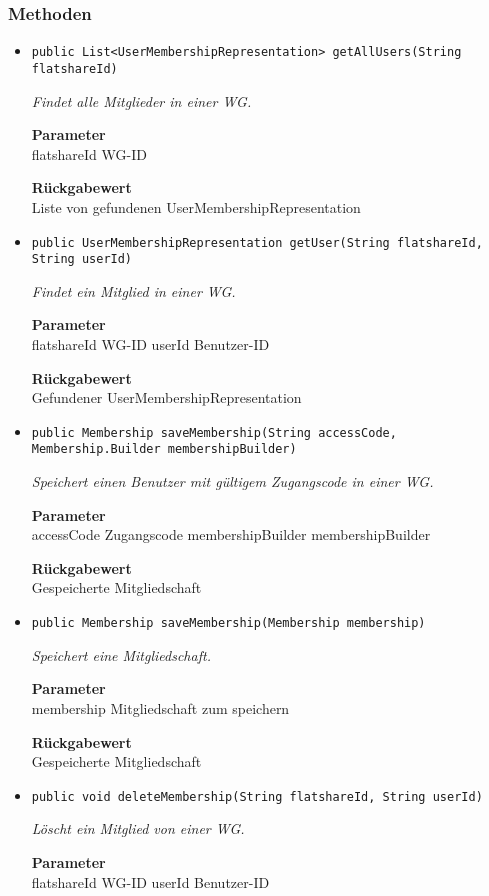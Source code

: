     \subsubsection{Methoden}
    \begin{itemize}
    	\item{\texttt{public List<UserMembershipRepresentation> getAllUsers(String flatshareId)}}
    	
    	\textit{Findet alle Mitglieder in einer WG.}
    	
    	\textbf{Parameter} \\
    	flatshareId WG-ID
    	
    	\textbf{Rückgabewert} \\
    	Liste von gefundenen UserMembershipRepresentation        \item{\texttt{public UserMembershipRepresentation getUser(String flatshareId, String userId)}}
    	
    	\textit{Findet ein Mitglied in einer WG.}
    	
    	\textbf{Parameter} \\
    	flatshareId WG-ID
    	userId Benutzer-ID
    	
    	\textbf{Rückgabewert} \\
    	Gefundener UserMembershipRepresentation        \item{\texttt{public Membership saveMembership(String accessCode, Membership.Builder membershipBuilder)}}
    	
    	\textit{Speichert einen Benutzer mit gültigem Zugangscode in einer WG.}
    	
    	\textbf{Parameter} \\
    	accessCode Zugangscode
    	membershipBuilder membershipBuilder
    	
    	\textbf{Rückgabewert} \\
    	Gespeicherte Mitgliedschaft        \item{\texttt{public Membership saveMembership(Membership membership)}}
    	
    	\textit{Speichert eine Mitgliedschaft.}
    	
    	\textbf{Parameter} \\
    	membership Mitgliedschaft zum speichern
    	
    	\textbf{Rückgabewert} \\
    	Gespeicherte Mitgliedschaft        \item{\texttt{public void deleteMembership(String flatshareId, String userId)}}
    	
    	\textit{Löscht ein Mitglied von einer WG.}
    	
    	\textbf{Parameter} \\
    	flatshareId WG-ID
    	userId Benutzer-ID
    	
    	
    \end{itemize}
